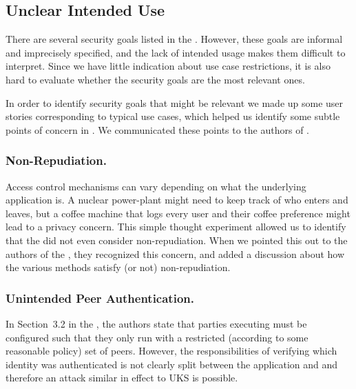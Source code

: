 \documentclass[runningheads]{llncs}
\begin{document}
\subsection{Unclear Intended Use}
\label{sec:unclearProtocolUse}
%
There are several security goals listed in the \mSpec{}.
%
However, these goals are informal and imprecisely specified, and the lack of
intended usage makes them difficult to interpret.
%
Since we have little indication about use case restrictions, it is also hard
to evaluate whether the security goals are the most relevant ones.
%

In order to identify security goals that might be relevant
we made up some user stories corresponding to typical use cases,
which helped us identify some subtle points of concern in \mEdhoc.
%
We communicated these points to the authors of \mEdhoc{}.
%

\subsubsection{Non-Repudiation.}
Access control mechanisms can vary depending on what the underlying 
application
is.
%
A nuclear power-plant might need to keep track of who enters and leaves, but 
a
coffee machine that logs every user and their coffee preference might lead to a
privacy concern.
%
This simple thought experiment allowed us to identify that the \mEdhoc{}
\mSpec{} did not even consider non-repudiation.
%
When we pointed this out to the authors of the \mSpec, they recognized this
concern, and added a discussion about how the various \mEdhoc{} methods
satisfy (or not) non-repudiation.
%

\subsubsection{Unintended Peer Authentication.}
\label{sec:unintendedPeerAuth}
In Section~3.2 in the \mSpec{}, the authors state that parties executing
\mEdhoc{} must be configured such that they only run \mEdhoc{} with a
restricted (according to some reasonable policy) set of peers.
%
However, the responsibilities of verifying which identity was authenticated is
not clearly split between the application and \mEdhoc{} and therefore an 
attack
similar in effect to UKS is possible.
%
\end{document}
